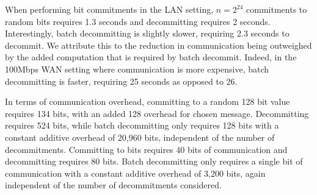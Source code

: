When performing bit commitments in the LAN setting, $n=2^{24}$ commitments to random bits requires 1.3 seconds and decommitting requires 2 seconds. Interestingly, batch decommitting is slightly slower, requiring 2.3 seconds to decommit. We attribute this to the reduction in communication being outweighed by the added computation that is required by batch decommit. Indeed, in the 100Mbps WAN setting where communication is more expensive, batch decommitting is faster, requiring 25 seconds as opposed to 26.

In terms of communication overhead, committing to a random 128 bit value requires 134 bits, with an added 128 overhead for chosen message. Decommitting requires 524 bits, while batch decommitting only requires 128 bits with a constant additive overhead of 20,960 bits, independent of the number of decommitments. Committing to bits requires 40 bits of communication and decommitting requires 80 bits. Batch decommitting only requires a single bit of communication with a constant additive overhead of 3,200 bits, again independent of the number of decommitments considered.

